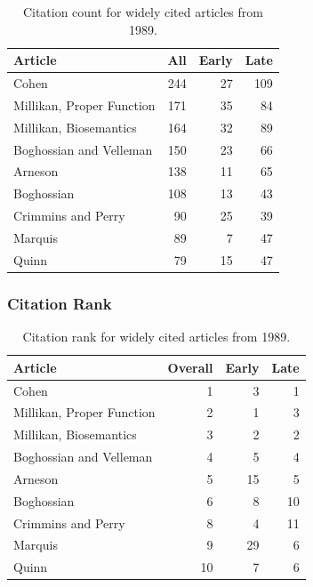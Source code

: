 \documentclass[
  10pt,
  letterpaper,
  DIV=11,
  numbers=noendperiod,
  twoside]{scrartcl}
\begin{document}
\begin{longtable}[]{@{}lrrr@{}}

\caption{\label{tbl-citation-count-1989}Citation count for widely cited
articles from 1989.}

\tabularnewline

\toprule\noalign{}
Article & All & Early & Late \\
\midrule\noalign{}
\endhead
\bottomrule\noalign{}
\endlastfoot
Cohen & 244 & 27 & 109 \\
Millikan, Proper Function & 171 & 35 & 84 \\
Millikan, Biosemantics & 164 & 32 & 89 \\
Boghossian and Velleman & 150 & 23 & 66 \\
Arneson & 138 & 11 & 65 \\
Boghossian & 108 & 13 & 43 \\
Crimmins and Perry & 90 & 25 & 39 \\
Marquis & 89 & 7 & 47 \\
Quinn & 79 & 15 & 47 \\

\end{longtable}

\subsubsection*{Citation Rank}\label{sec-rank-1989}

\begin{longtable}[]{@{}lrrr@{}}

\caption{\label{tbl-citation-rank-1989}Citation rank for widely cited
articles from 1989.}

\tabularnewline

\toprule\noalign{}
Article & Overall & Early & Late \\
\midrule\noalign{}
\endhead
\bottomrule\noalign{}
\endlastfoot
Cohen & 1 & 3 & 1 \\
Millikan, Proper Function & 2 & 1 & 3 \\
Millikan, Biosemantics & 3 & 2 & 2 \\
Boghossian and Velleman & 4 & 5 & 4 \\
Arneson & 5 & 15 & 5 \\
Boghossian & 6 & 8 & 10 \\
Crimmins and Perry & 8 & 4 & 11 \\
Marquis & 9 & 29 & 6 \\
Quinn & 10 & 7 & 6 \\

\end{longtable}
\end{document}
